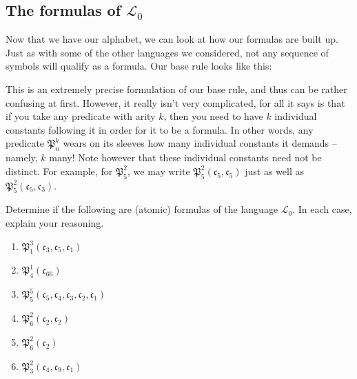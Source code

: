 \subsection{The formulas of $\mathcal{L}_0$}


Now that we have our alphabet, we can look at how our formulas are built up. Just as with some of the other languages we considered, not any sequence of symbols will qualify as a formula. Our base rule looks like this:


This is an extremely precise formulation of our base rule, and thus can be rather confusing at first. However, it really isn't very complicated, for all it says is that if you take any predicate with arity $k$, then you need to have $k$ individual constants following it in order for it to be a formula. In other words, any predicate $\mathfrak{P}^k_n$ wears on its sleeves how many individual constants it demands -- namely, $k$ many! Note however that these individual constants need not be distinct. For example, for $\mathfrak{P}^2_5$, we may write $\mathfrak{P}^2_5(\mathfrak{c}_5, \mathfrak{c}_5)$ just as well as $\mathfrak{P}^2_5(\mathfrak{c}_5, \mathfrak{c}_3)$. 

\begin{exc}
Determine if the following are (atomic) formulas of the language $\mathcal{L}_0$. In each case, explain your reasoning. 

\begin{enumerate}
	\item $\mathfrak{P}^3_1(\mathfrak{c}_3, \mathfrak{c}_5, \mathfrak{c}_1)$
	\item $\mathfrak{P}^1_4(\mathfrak{c}_{66})$
	\item $\mathfrak{P}^5_5(\mathfrak{c}_5, \mathfrak{c}_4, \mathfrak{c}_3, \mathfrak{c}_2, \mathfrak{c}_1)$
	\item $\mathfrak{P}^2_6(\mathfrak{c}_2, \mathfrak{c}_2)$
	\item $\mathfrak{P}^2_6(\mathfrak{c}_2)$
	\item $\mathfrak{P}^2_3(\mathfrak{c}_4, \mathfrak{c}_9, \mathfrak{c}_1)$
\end{enumerate}
\end{exc}

